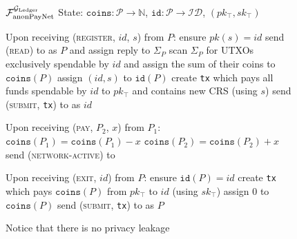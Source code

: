\begin{figure}[H]
  \begin{systembox}{$\mathcal{F}_{\mathrm{anonPayNet}}^{\mathcal{G}_{\mathrm{Ledger}}}$}
    State: $\mathtt{coins} : \mathcal{P} \rightarrow \mathbb{N}$,
    $\mathtt{id} : \mathcal{P} \rightarrow \mathcal{ID}$, $(pk_{\top},
    sk_{\top})$
    \begin{algorithmic}[1]
      \State Upon receiving (\textsc{register}, $id$, $s$) from $P$:
      \Indent
        \State ensure $pk(s) = id$
        \State send (\textsc{read}) to \ledger as $P$ and assign reply to
        $\Sigma_P$
        \State scan $\Sigma_P$ for UTXOs exclusively spendable by $id$ and
        assign the sum of their coins to $\mathtt{coins}(P)$
        \State assign $(id, s)$ to $\mathtt{id}(P)$
        \State create \texttt{tx} which pays all funds spendable by $id$ to
        $pk_{\top}$ and contains new CRS (using $s$) 
        \State send (\textsc{submit}, \texttt{tx}) to \ledger as $id$
      \EndIndent
      \Statex

      \State Upon receiving (\textsc{pay}, $P_2$, $x$) from $P_1$:
      \Indent
          \State $\mathtt{coins}(P_1) = \mathtt{coins}(P_1) - x$
          \State $\mathtt{coins}(P_2) = \mathtt{coins}(P_2) + x$
        \EndIf
        send (\textsc{network-active}) to \adversary
      \EndIndent
      \Statex

      \State Upon receiving (\textsc{exit}, $id$) from $P$:
      \Indent
        \State ensure $\mathtt{id}(P) = id$
        \State create \texttt{tx} which pays $\mathtt{coins}(P)$ from
        $pk_{\top}$ to $id$ (using $sk_{\top}$)
        \State assign $0$ to $\mathtt{coins}(P)$
        \State send (\textsc{submit}, \texttt{tx}) to \ledger as $P$
      \EndIndent
    \end{algorithmic}
  \end{systembox}
  \caption{Notice that there is no privacy leakage}
  \label{alg:anon-pay-func}
\end{figure}
